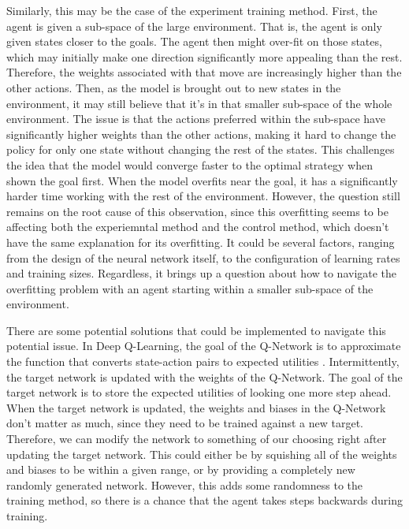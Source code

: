 \documentclass[12pt]{article}
\begin{document}
Similarly, this may be the case of the experiment training method.
First, the agent is given a sub-space of the large environment.
That is, the agent is only given states closer to the goals.
The agent then might over-fit on those states, which may initially make one direction significantly more appealing than the rest.
Therefore, the weights associated with that move are increasingly higher than the other actions.
Then, as the model is brought out to new states in the environment, it may still believe that it's in that smaller sub-space of the whole environment.
The issue is that the actions preferred within the sub-space have significantly higher weights than the other actions, making it hard to change the policy for only one state without changing the rest of the states.
This challenges the idea that the model would converge faster to the optimal strategy when shown the goal first.
When the model overfits near the goal, it has a significantly harder time working with the rest of the environment.
However, the question still remains on the root cause of this observation, since this overfitting seems to be affecting both the experiemntal method and the control method, which doesn't have the same explanation for its overfitting.
It could be several factors, ranging from the design of the neural network itself, to the configuration of learning rates and training sizes.
Regardless, it brings up a question about how to navigate the overfitting problem with an agent starting within a smaller sub-space of the environment.

There are some potential solutions that could be implemented to navigate this potential issue.
In Deep Q-Learning, the goal of the Q-Network is to approximate the function that converts state-action pairs to expected utilities \cite{article_reinforcement_learning_survey}.
Intermittently, the target network is updated with the weights of the Q-Network.
The goal of the target network is to store the expected utilities of looking one more step ahead.
When the target network is updated, the weights and biases in the Q-Network don't matter as much, since they need to be trained against a new target.
Therefore, we can modify the network to something of our choosing right after updating the target network.
This could either be by squishing all of the weights and biases to be within a given range, or by providing a completely new randomly generated network.
However, this adds some randomness to the training method, so there is a chance that the agent takes steps backwards during training.

\newpage


\end{document}
